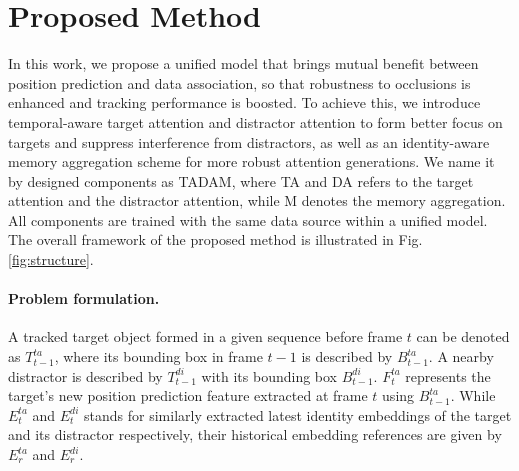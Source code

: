 \documentclass[final]{cvpr}
\begin{document}
\section{Proposed Method}

In this work, we propose a unified model that brings mutual benefit between position prediction and data association, so that robustness to occlusions is enhanced and tracking performance is boosted. To achieve this, we introduce temporal-aware target attention and distractor attention to form better focus on targets and suppress interference from distractors, as well as an identity-aware memory aggregation scheme for more robust attention generations. We name it by designed components as TADAM, where TA and DA refers to the target attention and the distractor attention, while M denotes the memory aggregation. All components are trained with the same data source within a unified model.
The overall framework of the proposed method is illustrated in Fig. \ref{fig:structure}.

\paragraph{Problem formulation.}
A tracked target object formed in a given sequence before frame \(t\) can be denoted as \(T^{ta}_{t-1}\), where its bounding box in frame \(t-1\) is described by \(B^{ta}_{t-1}\). A nearby distractor is described by \(T^{di}_{t-1}\) with its bounding box \(B^{di}_{t-1}\). 
\(F^{ta}_t\) represents the target's new position prediction feature extracted at frame \(t\) using \(B^{ta}_{t-1}\). While \(E^{ta}_t\) and \(E^{di}_t\) stands for similarly extracted latest identity embeddings of the target and its distractor respectively, their historical embedding references are given by \(E^{ta}_r\) and \(E^{di}_r\).
\end{document}
